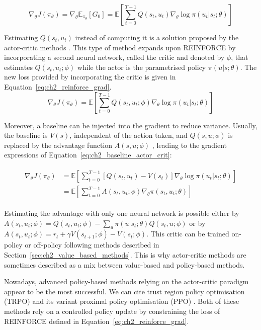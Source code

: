 \begin{equation}
\label{eq:ch2_reinforce_grad}
    \nabla_\theta J(\pi_\theta) = \nabla_\theta \mathbb{E}_{\pi_\theta}[G_0] = \mathbb{E}\left[\sum_{t=0}^{T-1} Q(s_t, u_t) \nabla_\theta \log \pi(u_t|s_t;\theta)\right]
\end{equation}

Estimating $Q(s_t, u_t)$ instead of computing it is a solution proposed by the actor-critic methods \citep{sutton1999policy,konda1999actor}.
This type of method expands upon REINFORCE by incorporating a second neural network, called the critic and denoted by $\phi$, that estimates $Q(s_t, u_t;\phi)$ while the actor is the parametrised policy $\pi(u|s;\theta)$.
The new loss provided by incorporating the critic is given in Equation~\ref{eq:ch2_reinforce_grad}.
\begin{equation}
\label{eq:ch2_Q_actor_crit}
    \nabla_\theta J(\pi_\theta) = \mathbb{E}\left[\sum_{t=0}^{T-1} Q(s_t, u_t;\phi) \nabla_\theta \log \pi(u_t|s_t;\theta)\right]
\end{equation}

Moreover, a baseline can be injected into the gradient to reduce variance.
Usually, the baseline is  $V(s)$, independent of the action taken, and $Q(s, u;\phi)$ is replaced by the advantage function $A(s,u; \phi)$ \citep{10.5555/2074022.2074088}, leading to the gradient expressions of Equation~\ref{eq:ch2_baseline_actor_crit}:

\begin{align}
\begin{split}
\label{eq:ch2_baseline_actor_crit}
    \nabla_\theta J(\pi_\theta)
    & = \mathbb{E}\left[\sum_{t=0}^{T-1} [Q(s_t, u_t) - V(s_t)] \nabla_\theta \log \pi(u_t|s_t;\theta)\right]\\
    & = \mathbb{E} \left[\sum_{t=0}^{T-1} A(s_t, u_t; \phi) \nabla_\theta \pi(s_t, u_t; \theta)\right]
\end{split}
\end{align}

Estimating the advantage with only one neural network is possible either by $A(s_t,u_t; \phi)=Q(s_t, u_t;\phi)-\sum_u \pi(u|s_t;\theta) Q(s_t,u; \phi)$ or by $A(s_t,u_t; \phi)=r_t +\gamma V(s_{t+1};\phi) - V(s_t;\phi)$.
This critic can be trained on-policy or off-policy following methods described in Section~\ref{sec:ch2_value_based_methods}.
This is why actor-critic methods are sometimes described as a mix between value-based and policy-based methods.

Nowadays, advanced policy-based methods relying on the actor-critic paradigm appear to be the most successful.
We can cite trust region policy optimisation (TRPO) \citep{schulman2015trust} and its variant proximal policy optimisation (PPO) \citep{schulman2017ppo}.
Both of these methods rely on a controlled policy update by constraining the loss of REINFORCE defined in Equation~\ref{eq:ch2_reinforce_grad}.

